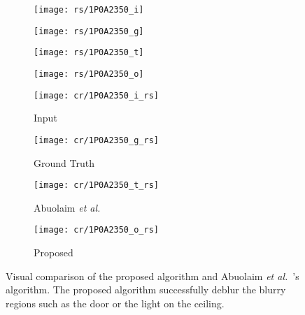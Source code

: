 \documentclass[final]{cvpr}
\begin{document}
\begin{figure*}
	\label{fig2}
	\begin{subfigure}[b]{0.245\textwidth}
                \texttt{[image: rs/1P0A2350\_i]}
        \end{subfigure}\hspace{\fill}
        \begin{subfigure}[b]{0.245\textwidth}
                \texttt{[image: rs/1P0A2350\_g]}
        \end{subfigure}\hspace{\fill}
        \begin{subfigure}[b]{0.245\textwidth}
                \texttt{[image: rs/1P0A2350\_t]}
        \end{subfigure}\hspace{\fill}
        \begin{subfigure}[b]{0.245\textwidth}
                \texttt{[image: rs/1P0A2350\_o]}
        \end{subfigure}
	
	
        \begin{subfigure}[b]{0.245\textwidth}
                \texttt{[image: cr/1P0A2350\_i\_rs]}
                \caption{Input}
                \label{fig:gull}
        \end{subfigure}\hspace{\fill}
        \begin{subfigure}[b]{0.245\textwidth}
                \texttt{[image: cr/1P0A2350\_g\_rs]}
                \caption{Ground Truth}
                \label{fig:gull2}
        \end{subfigure}\hspace{\fill}
        \begin{subfigure}[b]{0.245\textwidth}
                \texttt{[image: cr/1P0A2350\_t\_rs]}
                \caption{Abuolaim \textit{et al.}~\cite{abuolaim2020defocus} }
                \label{fig:tiger}
        \end{subfigure}\hspace{\fill}
        \begin{subfigure}[b]{0.245\textwidth}
                \texttt{[image: cr/1P0A2350\_o\_rs]}
                \caption{Proposed}
                \label{fig:mouse}
        \end{subfigure}
        \caption{Visual comparison of the proposed algorithm and Abuolaim \textit{et al.}~\cite{abuolaim2020defocus}'s algorithm. The proposed algorithm successfully deblur the blurry regions such as the door or the light on the ceiling.}\label{fig:two}
\end{figure*}
\end{document}
